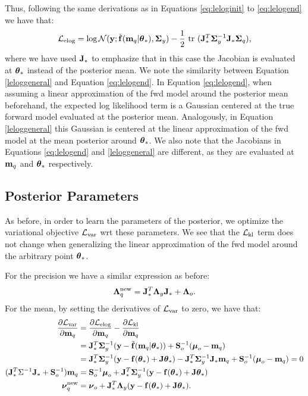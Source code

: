 %
Thus, following the same derivations as in Equations \eqref{eq:leloginit} to \eqref{eq:lelogend} we have that:
\begin{align}
	\label{leloggeneral}
	\mathcal{L}_{\text{{elog}}} = \log \mathcal{N}(\mathbf{y}; \tilde{\mathbf{f}}(\mathbf{m}_{q} | \boldsymbol{ \theta }_{*}), \mathbf{\Sigma}_{y}) - \frac{1}{2}  \mbox{ \rm tr } (\mathbf{J}_{*}^{T} \mathbf{\Sigma}_{y}^{-1} \mathbf{J}_{*} \mathbf{\Sigma}_{q}) \text{,}
\end{align}
where we have used $\mathbf{J}_{*}$ to emphasize that in this case the Jacobian is evaluated at $\boldsymbol{ \theta }_{*}$ instead of the posterior mean.
We note the similarity between Equation \eqref{leloggeneral} and Equation \eqref{eq:lelogend}.
In Equation  \eqref{eq:lelogend}, when assuming a linear approximation of the fwd model around the posterior mean beforehand,
the expected log likelihood term is a Gaussian centered at the true forward model evaluated at the posterior mean.
Analogously, in Equation \eqref{leloggeneral} this Gaussian is centered at the linear approximation of the fwd model 
at the mean posterior around $\boldsymbol{ \theta }_{*}$.  We also note that the Jacobians in Equations \eqref{eq:lelogend} and \eqref{leloggeneral}
are different, as they are evaluated at $\mathbf{m}_{q}$ and $\boldsymbol{ \theta }_{*}$ respectively.
%
\subsection{Posterior Parameters}
As before, in order to learn the parameters of the posterior, we optimize the variational objective $\mathcal{L}_{\text{var}}$ wrt these parameters. 
We see that the $\mathcal{L}_{\text{{kl}}}$ term does not change when generalizing the linear approximation of the fwd model around the 
arbitrary point $\boldsymbol{ \theta }_{*}$. 

For the precision we have a similar expression as before:
\begin{align}
 \mathbf{\Lambda}_{q}^{\text{new}} = \mathbf{J}_{*}^{T} \mathbf{\Lambda}_{y} \mathbf{J}_{*} + \mathbf{\Lambda}_{o} \text{.}
\end{align}
%
For the mean, by setting the derivatives of $\mathcal{L}_{\text{var}}$ to zero, we have that:
\begin{align}
	\nonumber
	 \frac{\partial{\mathcal{L}_{\text{var}}}}{\partial{ \mathbf{m} _{q}}} &= \frac{\partial{\mathcal{L}_{\text{{elog}}}}}{\partial{ \mathbf{m} _{q}}} - \frac{\partial{\mathcal{L}_{\text{{kl}}}}}{\partial{ \mathbf{m} _{q}}} \\
	\nonumber	 
	 &= \mathbf{J}_{*}^{T} \mathbf{\Sigma}_{y}^{-1} (\mathbf{y} - \tilde{\mathbf{f}}(\mathbf{m}_{q} | \boldsymbol{ \theta }_{*})) + \mathbf{S}_{o}^{-1}(\boldsymbol{ \mu }_{o} - \mathbf{m}_{q})  \\
	\nonumber	 
	 & = \mathbf{J}_{*}^{T}\mathbf{\Sigma}_{y}^{-1}(\mathbf{y} - \mathbf{f}(\boldsymbol{ \theta }_{*}) + \mathbf{J}  \boldsymbol{ \theta }_{*}) - \mathbf{J}_{*}^{T}\mathbf{\Sigma}_{y}^{-1} \mathbf{J}_{*} \mathbf{m}_{q} + \mathbf{S}_{o}^{-1}(\boldsymbol{ \mu }_{o} - \mathbf{m}_{q}) =0 \\
	\nonumber	
	(  \mathbf{J}_{*}^{T}\Sigma^{-1} \mathbf{J}_{*} + \mathbf{S}_{o}^{-1}) \mathbf{m}_{q} &= \mathbf{S}_{o}^{-1} \boldsymbol{ \mu }_{o} +  \mathbf{J}_{*}^{T}\mathbf{\Sigma}_{y}^{-1}(\mathbf{y} - \mathbf{f}(\boldsymbol{ \theta }_{*}) + \mathbf{J}  \boldsymbol{ \theta }_{*}) \\
	\boldsymbol{ \nu }_{q}^{\text{new}} &= \boldsymbol{ \nu }_{o} + \mathbf{J}_{*}^{T}\mathbf{\Lambda}_{y}(\mathbf{y} - \mathbf{f}(\boldsymbol{ \theta }_{*}) + \mathbf{J}  \boldsymbol{ \theta }_{*}) \text{.}
\end{align}	
%
